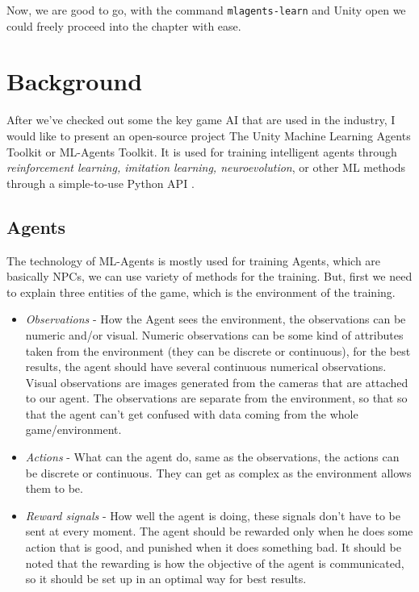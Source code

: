 \documentclass[a4paper, 12pt]{book}
\begin{document}
Now, we are good to go, with the command \texttt{mlagents-learn} and Unity open we could freely proceed into the chapter with ease.

\section{Background}

After we've checked out some the key game AI that are used in the industry, I would like to present an open-source project The Unity Machine Learning Agents Toolkit or ML-Agents Toolkit. It is used for training intelligent agents through \emph{reinforcement learning, imitation learning, neuroevolution}, or other ML methods through a simple-to-use Python API \cite{MLAgents}.

\subsection{Agents}

The technology of ML-Agents is mostly used for training Agents, which are basically NPCs, we can use variety of methods for the training. But, first we need to explain three entities of the game, which is the environment of the training.

\begin{itemize}
    \item \emph{Observations} - How the Agent sees the environment, the observations can be numeric and/or visual. Numeric observations can be some kind of attributes taken from the environment (they can be discrete or continuous), for the best results, the agent should have several continuous numerical observations. Visual observations are images generated from the cameras that are attached to our agent. The observations are separate from the environment, so that so that the agent can't get confused with data coming from the whole game/environment.
    \item \emph{Actions} - What can the agent do, same as the observations, the actions can be discrete or continuous. They can get as complex as the environment allows them to be.
    \item \emph{Reward signals} - How well the agent is doing, these signals don't have to be sent at every moment. The agent should be rewarded only when he does some action that is good, and punished when it does something bad. It should be noted that the rewarding is how the objective of the agent is communicated, so it should be set up in an optimal way for best results.
\end{itemize}
\end{document}
